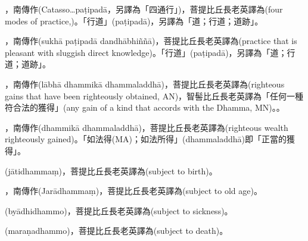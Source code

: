 \startitemgroup[noteitems]
\item{}，南傳作(Catasso…paṭipadā，另譯為「四通行」)，菩提比丘長老英譯為(four modes of practice,)。「行道」(paṭipadā)，另譯為「道；行道；道跡」。
\stopitemgroup

\startitemgroup[noteitems]
\item{}，南傳作(sukhā paṭipadā dandhābhiññā)，菩提比丘長老英譯為(practice that is pleasant with sluggish direct knowledge)。「行道」(paṭipadā)，另譯為「道；行道；道跡」。
\stopitemgroup

\startitemgroup[noteitems]
\item{}，南傳作(lābhā dhammikā dhammaladdhā)，菩提比丘長老英譯為(righteous gains that have been righteously obtained, AN)，智髻比丘長老英譯為「任何一種符合法的獲得」(any gain of a kind that accords with the Dhamma, MN)。。
\item{}，南傳作(dhammikā dhammaladdhā)，菩提比丘長老英譯為(righteous wealth righteously gained)。「如法得(MA)；如法所得」(dhammaladdhā)即「正當的獲得」。
\stopitemgroup

\startitemgroup[noteitems]
\item{}(jātidhammaṃ)，菩提比丘長老英譯為(subject to birth)。
\item{}，南傳作(Jarādhammaṃ)，菩提比丘長老英譯為(subject to old age)。
\item{}(byādhidhammo)，菩提比丘長老英譯為(subject to sickness)。
\item{}(maraṇadhammo)，菩提比丘長老英譯為(subject to death)。
\stopitemgroup

